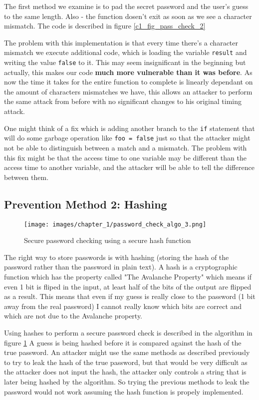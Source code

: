 The first method we examine is to pad the secret password and the user's guess
to the same length. Also - the function dosen't exit as soon as we see a character
mismatch. The code is described in figure 
 \ref{c1_fig_pass_check_2}

The problem with this implementation is that every time there's a character
mismatch we execute additional code, which is loading the variable
\lstinline{result} and writing the value \lstinline{false} to it. This may seem
insignificant in the beginning but actually, this makes our code \textbf{much
more vulnerable than it was before}. As now the time it takes for the entire
function to complete is linearly dependant on the amount of characters
mismatches we have, this allows an attacker to perform the same attack from
before with no significant changes to his original timing attack.

One might think of a fix which is adding another branch to the \lstinline{if}
statement that will do some garbage operation like \lstinline{foo = false} just
so that the attacker might not be able to distinguish between a match
and a mismatch. The problem with this fix might be that the access time to one
variable may be different than the access time to another variable, and the
attacker will be able to tell the difference between them.


\subsection{Prevention Method 2: Hashing}
\begin{figure}[H]
    
    \texttt{[image: images/chapter\_1/password\_check\_algo\_3.png]}
    \caption{Secure password checking using a secure hash function}
    \label{c1_fig_pass_check_3}
\end{figure}

The right way to store passwords is with hashing (storing the hash of the
password rather than the password in plain text). A hash is a cryptographic
function which has the property called "The Avalanche Property" which means if
even 1 bit is fliped in the input, at least half of the bits of the output are
flipped as a result. This means that even if my guess is really close to the
password (1 bit away from the real password) I cannot really know which bits are
correct and which are not due to the Avalanche property.

Using hashes to perform a secure password check is described in the algorithm in
figure \ref{c1_fig_pass_check_3} A guess is being hashed before it is compared
against the hash of the true password. An attacker might use the same methods
as described previously to try to leak the hash of the true password, but that would be very
difficult as the attacker does not input the hash, the attacker only controls a
string that is later being hashed by the algorithm. So trying the previous methods
to leak the password would not work assuming the hash function is propely
implemented. 


